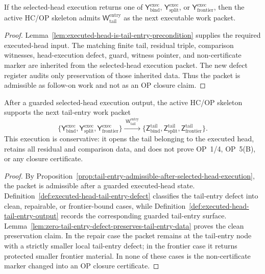 \begin{proposition}
\label{prop:tail-entry-admissible-after-selected-head-execution}
If the selected-head execution returns one of \(\mathsf Y_{\mathrm{bind}}^{\mathrm{exec}}\), \(\mathsf Y_{\mathrm{split}}^{\mathrm{exec}}\), or \(\mathsf Y_{\mathrm{frontier}}^{\mathrm{exec}}\), then the active HC/OP skeleton admits \(\mathsf W_{\mathrm{tail}}^{\mathrm{entry}}\) as the next executable work packet.
\end{proposition}

\begin{proof}
Lemma~\ref{lem:executed-head-is-tail-entry-precondition} supplies the required executed-head input. The matching finite tail, residual triple, comparison witnesses, head-execution defect, guard, witness pointer, and non-certificate marker are inherited from the selected-head execution packet. The new defect register audits only preservation of those inherited data. Thus the packet is admissible as follow-on work and not as an OP closure claim.
\end{proof}

\begin{theorem}
\label{thm:first-executed-head-tail-entry-packet}
After a guarded selected-head execution output, the active HC/OP skeleton supports the next tail-entry work packet
\[
 \{\mathsf Y_{\mathrm{bind}}^{\mathrm{exec}},
 \mathsf Y_{\mathrm{split}}^{\mathrm{exec}},
 \mathsf Y_{\mathrm{frontier}}^{\mathrm{exec}}\}
 \xrightarrow{\;\mathsf W_{\mathrm{tail}}^{\mathrm{entry}}\;}
 \{\mathsf Z_{\mathrm{bind}}^{\mathrm{tail}},
 \mathsf Z_{\mathrm{split}}^{\mathrm{tail}},
 \mathsf Z_{\mathrm{frontier}}^{\mathrm{tail}}\}.
\]
This execution is conservative: it opens the tail belonging to the executed head, retains all residual and comparison data, and does not prove OP~1/4, OP~5(B), or any closure certificate.
\end{theorem}

\begin{proof}
By Proposition~\ref{prop:tail-entry-admissible-after-selected-head-execution}, the packet is admissible after a guarded executed-head state. Definition~\ref{def:executed-head-tail-entry-defect} classifies the tail-entry defect into clean, repairable, or frontier-bound cases, while Definition~\ref{def:executed-head-tail-entry-output} records the corresponding guarded tail-entry surface. Lemma~\ref{lem:zero-tail-entry-defect-preserves-tail-entry-data} proves the clean preservation claim. In the repair case the packet remains at the tail-entry node with a strictly smaller local tail-entry defect; in the frontier case it returns protected smaller frontier material. In none of these cases is the non-certificate marker changed into an OP closure certificate.
\end{proof}

